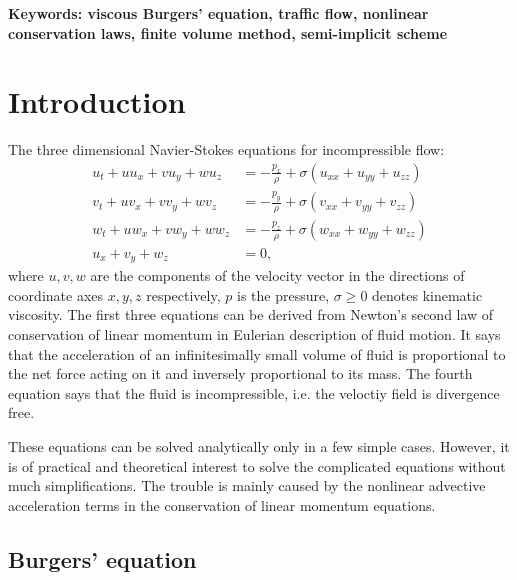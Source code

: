 \documentclass[a4paper,12pt,twoside]{report}%
\begin{document}
	\textbf{Keywords: viscous Burgers' equation,  traffic flow, nonlinear conservation laws, finite volume method, semi-implicit scheme}
	\newpage
{\pagestyle{headings}
	\tableofcontents
	\cleardoublepage}


\chapter{Introduction}\label{introduction}%
The three dimensional Navier-Stokes equations for incompressible flow:
\begin{align}
	u_t + u u_x + v u_y + w u_z &= - \frac{p_x}{\rho} + \sigma (u_{xx} + u_{yy} + u_{zz})\nonumber \\
	v_t + u v_x + v v_y + w v_z &= - \frac{p_y}{\rho} + \sigma (v_{xx} + v_{yy} + v_{zz}) \label{navier-stokes} \\
	w_t + u w_x + v w_y + w w_z &= - \frac{p_z}{\rho} + \sigma (w_{xx} + w_{yy} + w_{zz})\nonumber \\
	u_x + v_y + w_z &= 0\nonumber,
\end{align}
where $ u, v, w $ are the components of the velocity vector in the directions of coordinate axes $ x, y, z $ respectively, $ p $ is the pressure, $ \sigma \geq 0 $ denotes kinematic viscosity. The first three equations can be derived from Newton's second law of conservation of linear momentum in Eulerian description of fluid motion. It says that the acceleration of an infinitesimally small volume of fluid is proportional to the net force acting on it and inversely proportional to its mass. The fourth equation says that the fluid is incompressible, i.e. the veloctiy field is divergence free.
\par These equations can be solved analytically only in a few simple cases. However, it is of practical and theoretical interest to solve the complicated equations without much simplifications. The trouble is mainly caused by the nonlinear advective acceleration terms in the conservation of linear momentum equations.
\section{Burgers' equation}
\end{document}

